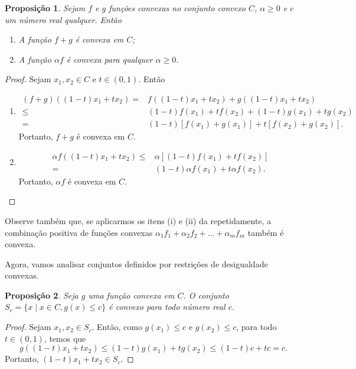 \documentclass[12pt,a4paper]{scrartcl}
\newtheorem{prop}{Proposição}
\theoremstyle{definition}%
\begin{document}
\begin{prop} \label{prop:combinacao_funcoes_convexa}
Sejam $f$ e $g$ funções convexas no conjunto convexo $C$, $\alpha \geq 0$ e $c$ um número real qualquer. Então
\begin{enumerate}
	\item[(i)] A função $f+g$ é convexa em $C$;
	\item[(ii)] A função $\alpha f$ é convexa para qualquer $\alpha \geq 0$.
\end{enumerate}
\end{prop}
\begin{proof}
Sejam $x_{1}, x_{2} \in C$ e $t\in (0,1)$. Então
\begin{enumerate}
\item[(i)] 
\[
\begin{aligned}
(f+g)((1-t)x_{1} + tx_{2}) =& f((1-t)x_{1} + tx_{2}) + g((1-t)x_{1} + tx_{2}) \\
\leq & (1-t)f(x_{1}) + tf(x_{2}) + (1-t)g(x_{1}) + tg(x_{2}) \\
=& (1-t)[f(x_{1}) + g(x_{1})] + t[f(x_{2}) + g(x_{2})] .
\end{aligned}
\]
Portanto, $f+g$ é convexa em $C$.
\item[(ii)] 
\[
\begin{aligned}
\alpha f((1-t)x_{1} + tx_{2}) \leq & \alpha [(1-t)f(x_{1}) + tf(x_{2})] \\
=& (1-t)\alpha f(x_{1}) + t\alpha f(x_{2}) .
\end{aligned}
\]
Portanto, $\alpha f$ é convexa em $C$.
\end{enumerate}	
\end{proof}

Observe também que, se aplicarmos os itens (i) e (ii) da  repetidamente, a combinação positiva de funções convexas $\alpha_{1} f_{1} +\alpha_{2} f_{2} + \ldots +\alpha_{m} f_{m}$ também é convexa. 

Agora, vamos analisar conjuntos definidos por restrições de desigualdade convexas.

\begin{prop}
Seja $g$ uma função convexa em $C$. O conjunto $S_{c} = \{ x \mid x\in C, g(x)\leq c \}$ é convexo para todo número real $c$.
\end{prop}
\begin{proof}
Sejam $x_{1}, x_{2} \in S_{c}$. Então, como $g(x_1) \leq c$ e $g(x_2) \leq c$, para todo $t\in (0,1)$, temos que
\[
g((1-t)x_{1} + tx_{2}) \leq (1-t)g(x_{1}) + tg(x_{2}) \leq (1-t)c + tc = c.
\]
Portanto, $(1-t)x_{1} + tx_{2} \in S_{c}$.
\end{proof}
\end{document}

